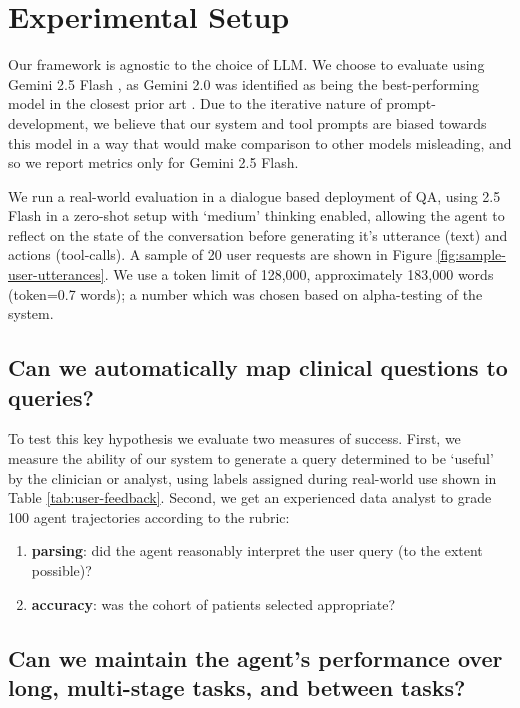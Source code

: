 \documentclass[11pt]{article}
\begin{document}
\section{Experimental Setup}
Our framework is agnostic to the choice of LLM. We choose to evaluate using Gemini 2.5 Flash \citet{comanici_gemini_2025}, as Gemini 2.0 was identified as being the best-performing model in the closest prior art \citet{ziletti_generating_2025}.
Due to the iterative nature of prompt-development, we believe that our system and tool prompts are biased towards this model in a way that would make comparison to other models misleading, and so we report metrics only for Gemini 2.5 Flash.

We run a real-world evaluation in a dialogue based deployment of QA, using 2.5 Flash in a zero-shot setup with `medium' thinking enabled, allowing the agent to reflect on the state of the conversation before generating it's utterance (text) and actions (tool-calls). A sample of 20 user requests are shown in Figure \ref{fig:sample-user-utterances}. We use a token limit of 128,000, approximately 183,000 words (token=0.7 words); a number which was chosen based on alpha-testing of the system.

\subsection*{Can we automatically map clinical questions to queries?}

To test this key hypothesis we evaluate two measures of success.
First, we measure the ability of our system to generate a query determined to be `useful' by the clinician or analyst, using labels assigned during real-world use shown in Table \ref{tab:user-feedback}.
Second, we get an experienced data analyst to grade 100 agent trajectories according to the rubric:
\begin{enumerate}
	\item \textbf{parsing}: did the agent reasonably interpret the user query (to the extent possible)?
	\item \textbf{accuracy}: was the cohort of patients selected appropriate? 
\end{enumerate}


\subsection*{Can we maintain the agent's performance over long, multi-stage tasks, and between tasks?}
\end{document}
